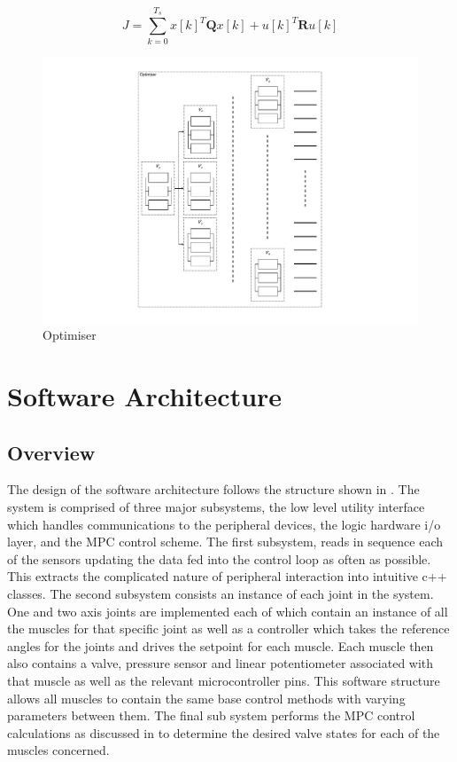 \documentclass[11pt,a4paper]{article}
\begin{document}
\begin{equation}
    J = \sum_{k=0}^{T_s} x\left[k\right]^T\textbf{Q}x\left[k\right] + u\left[k\right]^T\textbf{R}u\left[k\right]
    \label{math:cost_function}
\end{equation}

\begin{figure}[!hbt]
    \centering
    \includegraphics[clip, trim=5cm 1cm 5cm 1cm, width=1.00\textwidth]{BlockDiagram_Optimiser.pdf}
    \caption{Optimiser}
    \label{fig:control_diagram_optimiser}
\end{figure}

\clearpage
\section{Software Architecture}
\label{sub:software}


\subsection{Overview}
\label{sub:software_overview}

The design of the software architecture follows the structure shown in . The system is comprised of three major subsystems, the low level utility interface which handles communications to the peripheral devices, the logic hardware i/o layer, and the MPC control scheme. The first subsystem, reads in sequence each of the sensors updating the data fed into the control loop as often as possible. This extracts the complicated nature of peripheral interaction into intuitive c++ classes. The second subsystem consists an instance of each joint in the system. One and two axis joints are implemented each of which contain an instance of all the muscles for that specific joint as well as a controller which takes the reference angles for the joints and drives the setpoint for each muscle. Each muscle then also contains a valve, pressure sensor and linear potentiometer associated with that muscle as well as the relevant microcontroller pins. This software structure allows all muscles to contain the same base control methods with varying parameters between them. The final sub system performs the MPC control calculations as discussed in  to determine the desired valve states for each of the muscles concerned.
\end{document}
